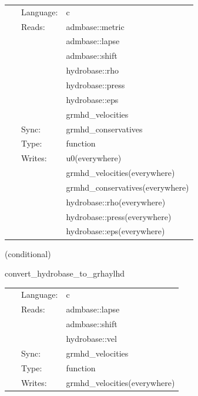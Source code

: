 \hspace{5mm}

 \begin{tabular*}{160mm}{cll} 
~ & Language:  & c \\ 
~ & Reads:  & admbase::metric \\ 
~& ~ &admbase::lapse\\ 
~& ~ &admbase::shift\\ 
~& ~ &hydrobase::rho\\ 
~& ~ &hydrobase::press\\ 
~& ~ &hydrobase::eps\\ 
~& ~ &grmhd\_velocities\\ 
~ & Sync:  & grmhd\_conservatives \\ 
~ & Type:  & function \\ 
~ & Writes:  & u0(everywhere) \\ 
~& ~ &grmhd\_velocities(everywhere)\\ 
~& ~ &grmhd\_conservatives(everywhere)\\ 
~& ~ &hydrobase::rho(everywhere)\\ 
~& ~ &hydrobase::press(everywhere)\\ 
~& ~ &hydrobase::eps(everywhere)\\ 
\end{tabular*} 


\vspace{5mm}

   (conditional) 

\hspace{5mm} convert\_hydrobase\_to\_grhaylhd 

\hspace{5mm}{\it convert hydrobase initial data to grhaylhd variables } 


\hspace{5mm}

 \begin{tabular*}{160mm}{cll} 
~ & Language:  & c \\ 
~ & Reads:  & admbase::lapse \\ 
~& ~ &admbase::shift\\ 
~& ~ &hydrobase::vel\\ 
~ & Sync:  & grmhd\_velocities \\ 
~ & Type:  & function \\ 
~ & Writes:  & grmhd\_velocities(everywhere) \\ 
\end{tabular*} 


